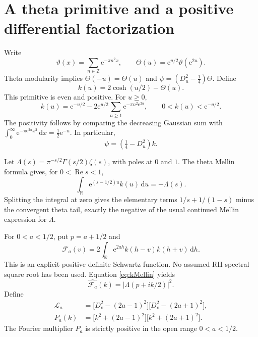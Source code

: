 \documentclass[11pt,letterpaper]{article}
\numberwithin{equation}{section}
\theoremstyle{remark}\newtheorem{remark}[proposition]{Remark}
\newcommand{\R}{\mathbb R}
\newcommand{\dd}{\,\mathrm d}
\newcommand{\calF}{\mathcal F}
\newcommand{\Repart}{\operatorname{Re}}
\newcommand{\ee}{\mathrm e}
\begin{document}
\section{A theta primitive and a positive differential factorization}
Write
\[
 \vartheta(x)=\sum_{n\in\mathbb Z}\ee^{-\pi n^2x},
 \qquad \Theta(u)=\ee^{u/2}\vartheta(\ee^{2u}).
\]
Theta modularity implies $\Theta(-u)=\Theta(u)$ and
$\psi=(D_u^2-\tfrac14)\Theta$.
Define
\begin{equation}\label{eq:primitive}
 k(u)=2\cosh(u/2)-\Theta(u).
\end{equation}
This primitive is even and positive. For $u\ge0$,
\[
 k(u)=\ee^{-u/2}-2\ee^{u/2}
             \sum_{n\ge1}\ee^{-\pi n^2\ee^{2u}},
 \qquad 0<k(u)<\ee^{-u/2}.
\]
The positivity follows by comparing the decreasing Gaussian sum with
$\int_0^\infty\ee^{-\pi\ee^{2u}x^2}\dd x=\tfrac12\ee^{-u}$.
In particular,
\begin{equation}
 \psi=(\tfrac14-D_u^2)k.
\end{equation}

Let $\Lambda(s)=\pi^{-s/2}\Gamma(s/2)\zeta(s)$, with poles at $0$ and $1$.
The theta Mellin formula gives, for $0<\Repart s<1$,
\begin{equation}\label{eq:kMellin}
 \int_{\R}\ee^{(s-1/2)u}k(u)\dd u=-\Lambda(s).
\end{equation}
Splitting the integral at zero gives the elementary terms
$1/s+1/(1-s)$ minus the convergent theta tail, exactly the negative of the usual continued Mellin expression for $\Lambda$.

For $0<a<1/2$, put $p=a+1/2$ and
\begin{equation}\label{eq:F}
 \calF_a(v)=2\int_{\R}\ee^{2ah}k(h-v)k(h+v)\dd h.
\end{equation}
This is an explicit positive definite Schwartz function. No assumed RH spectral square root has been used. Equation \eqref{eq:kMellin} yields
\begin{equation}\label{eq:Fhat}
 \widehat{\calF_a}(k)=|\Lambda(p+ik/2)|^2.
\end{equation}
Define
\begin{align}
 \mathcal L_a
 &=\bigl[D_v^2-(2a-1)^2\bigr]
   \bigl[D_v^2-(2a+1)^2\bigr],\\
 P_a(k)&=\bigl[k^2+(2a-1)^2\bigr]
         \bigl[k^2+(2a+1)^2\bigr].
\end{align}
The Fourier multiplier $P_a$ is strictly positive in the open range $0<a<1/2$.
\end{document}
